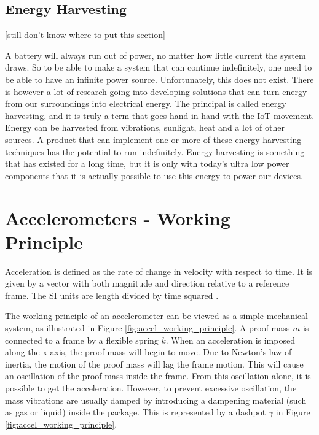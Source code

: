 \subsection{Energy Harvesting}

[still don't know where to put this section]

A battery will always run out of power, no matter how little current the system draws. So to be able to make a system that can continue indefinitely, one need to be able to have an infinite power source. Unfortunately, this does not exist. There is however a lot of research going into developing solutions that can turn energy from our surroundings into electrical energy. The principal is called energy harvesting, and it is truly a term that goes hand in hand with the IoT movement. Energy can be harvested from vibrations, sunlight, heat and a lot of other sources. A product that can implement one or more of these energy harvesting techniques has the potential to run indefinitely. Energy harvesting is something that has existed for a long time, but it is only with today's ultra low power components that it is actually possible to use this energy to power our devices.

\section{Accelerometers - Working Principle} \label{sec:accel_working_principle}

Acceleration is defined as the rate of change in velocity with respect to time. It is given by a vector with both magnitude and direction relative to a reference frame. The SI units are length divided by time squared \cite{elert98}.

The working principle of an accelerometer can be viewed as a simple mechanical system, as illustrated in Figure \ref{fig:accel_working_principle}. A proof mass $m$ is connected to a frame by a flexible spring $k$. When an acceleration is imposed along the x-axis, the proof mass will begin to move. Due to Newton's law of inertia, the motion of the proof mass will lag the frame motion. This will cause an oscillation of the proof mass inside the frame. From this oscillation alone, it is possible to get the acceleration. However, to prevent excessive oscillation, the mass vibrations are usually damped by introducing a dampening material (such as gas or liquid) inside the package. This is represented by a dashpot $\gamma$ in Figure \ref{fig:accel_working_principle}.


